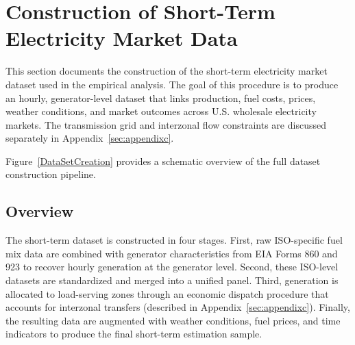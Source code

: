 \documentclass[12pt]{article}
\begin{document}







\section{Construction of Short-Term Electricity Market Data}
\label{sec:appendix_shortterm}

This section documents the construction of the short-term electricity market dataset used in the empirical analysis. The goal of this procedure is to produce an hourly, generator-level dataset that links production, fuel costs, prices, weather conditions, and market outcomes across U.S. wholesale electricity markets. The transmission grid and interzonal flow constraints are discussed separately in Appendix~\ref{sec:appendixc}.

Figure~\ref{DataSetCreation} provides a schematic overview of the full dataset construction pipeline.

\subsection{Overview}

The short-term dataset is constructed in four stages. First, raw ISO-specific fuel mix data are combined with generator characteristics from EIA Forms 860 and 923 to recover hourly generation at the generator level. Second, these ISO-level datasets are standardized and merged into a unified panel. Third, generation is allocated to load-serving zones through an economic dispatch procedure that accounts for interzonal transfers (described in Appendix~\ref{sec:appendixc}). Finally, the resulting data are augmented with weather conditions, fuel prices, and time indicators to produce the final short-term estimation sample.
\end{document}
